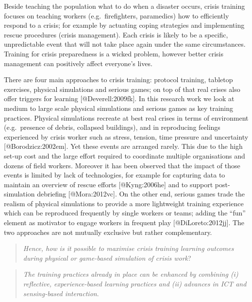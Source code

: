 Beside teaching the population what to do when a disaster occurs, crisis
training focuses on teaching workers (e.g.~firefighters, paramedics) how
to efficiently respond to a crisis; for example by actuating coping
strategies and implementing rescue procedures (crisis management). Each
crisis is likely to be a specific, unpredictable event that will not
take place again under the same circumstances. Training for crisis
preparedness is a wicked problem, however better crisis management can
positively affect everyone's lives.

There are four main approaches to crisis training: protocol training,
tabletop exercises, physical simulations and serious games; on top of
that real crises also offer triggers for learning
{[}@Deverell:2009fk{]}. In this research work we look at medium to large
scale physical simulations and serious games as key training
practices. Physical simulations
recreate at best real crises in terms of environment (e.g.~presence of
debris, collapsed buildings), and in reproducing feelings experienced by
crisis worker such as stress, tension, time pressure and uncertainty
{[}@Borodzicz:2002em{]}. Yet these events are arranged rarely. This due
to the high set-up cost and the large effort required to coordinate
multiple organisations and dozens of field workers. Moreover it has been
observed that the impact of those events is limited by lack of
technologies, for example for capturing data to maintain an overview of
rescue efforts {[}@Kyng:2006he{]} and to support post-simulation
debriefing {[}@Mora:2012vc{]}. On the other end, serious games trade the
realism of physical simulations to provide a more lightweight training
experience which can be reproduced frequently by single workers or
teams; adding the ``fun'' element as motivator to engage workers in
frequent play {[}@DiLoreto:2012jj{]}. The two approaches are not
mutually exclusive but rather complementary.

\begin{quote}
\emph{Hence, how is it possible to maximise crisis training learning
outcomes during physical or game-based simulation of crisis work}?
\end{quote}

\begin{quote}
\emph{The training practices already in place can be enhanced by
combining (i) reflective, experience-based learning practices and (ii)
advances in ICT and sensing-based interaction}.
\end{quote}

